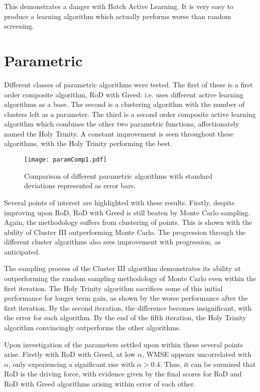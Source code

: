 This demonstrates a danger with Batch Active Learning. It is very easy to produce a learning algorithm which actually performs worse than random screening.

\section{Parametric}
Different classes of parametric algorithms were tested. The first of these is a first order composite algorithm, RoD with Greed: i.e. uses different active learning algorithms as a base. The second is a clustering algorithm with the number of clusters left as a parameter. The third is a second order composite active learning algorithm which combines the other two parametric functions, affectionately named the Holy Trinity. A constant improvement is seen throughout these algorithms, with the Holy Trinity performing the best.

\begin{figure}[h]
    \begin{center}
        \texttt{[image: paramComp1.pdf]}
        \caption[Non-parametric comparison]{Comparison of different parametric algorithms with standard deviations represented as error bars.}
        \label{fig:pComp}
    \end{center}
\end{figure}

Several points of interest are highlighted with these results. Firstly, despite improving upon RoD, RoD with Greed is still beaten by Monte Carlo sampling. Again, the methodology suffers from clustering of points. This is shown with the ability of Cluster III outperforming Monte Carlo. The progression through the different cluster algorithms also sees improvement with progression, as anticipated.

The sampling process of the Cluster III algorithm demonstrates its ability at outperforming the random sampling methodology of Monte Carlo even within the first iteration. The Holy Trinity algorithm sacrifices some of this initial performance for longer term gain, as shown by the worse performance after the first iteration. By the second iteration, the difference becomes insignificant, with the error for each algorithm. By the end of the fifth iteration, the Holy Trinity algorithm convincingly outperforms the other algorithms.

Upon investigation of the parameters settled upon within these several points arise. Firstly with RoD with Greed, at low $\alpha$, WMSE appears uncorrelated with $\alpha$, only experiencing a significant rise with $\alpha{}>0.4$. Thus, it can be surmised that RoD is the driving force, with evidence given by the final scores for RoD and RoD with Greed algorithms arising within error of each other.

